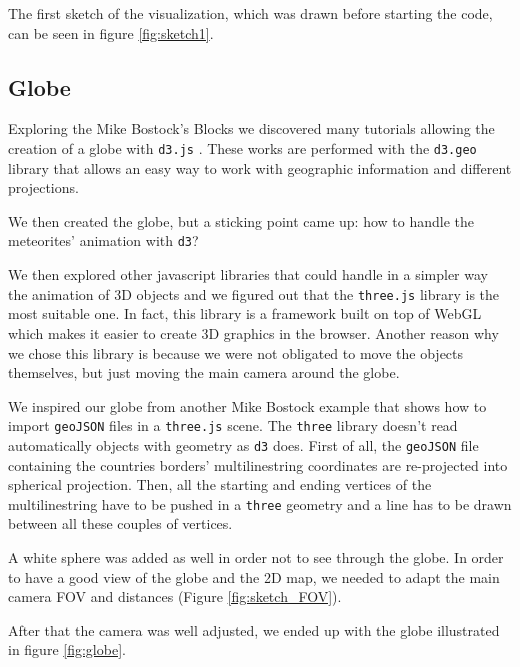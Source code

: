 \documentclass[10pt,conference,compsocconf]{IEEEtran}
\begin{document}
The first sketch of the visualization, which was drawn before starting the code, can be seen in figure \ref{fig:sketch1}.




\subsection{Globe}
Exploring the Mike Bostock's Blocks \cite{bostock_mike_nodate} we discovered many tutorials allowing the creation of a globe with \texttt{d3.js} \cite{bostock_see-through_nodate,bostock_globe_nodate}.  These works are performed with the \texttt{d3.geo} library that allows an easy way to work with geographic information and different projections.

We then created the globe, but a sticking point came up: how to handle the meteorites' animation with \texttt{d3}?

We then explored other javascript libraries that could handle in a simpler way the animation of 3D objects and we figured out that the \texttt{three.js} library \cite{BibEntry2017Nov} is the most suitable one. In fact, this library is a framework built on top of WebGL which makes it easier to create 3D graphics in the browser. 
Another reason why we chose this library is because we were not obligated to move the objects themselves, but just moving the main camera around the globe. 

We inspired our globe from another Mike Bostock example \cite{BibEntry2017Aug} that shows how to import \texttt{geoJSON} files in a \texttt{three.js} scene. The \texttt{three} library doesn't read automatically objects with geometry as \texttt{d3} does. First of all, the \texttt{geoJSON} file containing the countries borders' multilinestring \cite{countryfile} coordinates are re-projected into spherical projection. Then, all the starting and ending vertices of the multilinestring have to be pushed in a \texttt{three} geometry and a line has to be drawn between all these couples of vertices.


A white sphere was added as well in order not to see through the globe. In order to have a good view of the globe and the 2D map, we needed to adapt the main camera FOV and distances (Figure \ref{fig:sketch_FOV}).

After that the camera was well adjusted, we ended up with the globe illustrated in figure \ref{fig:globe}.
\end{document}
